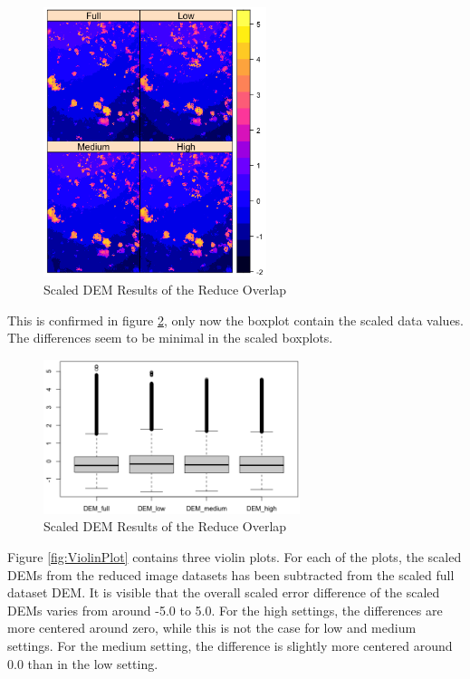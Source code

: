 \documentclass{isprs} %
\begin{document}
\begin{figure}[h]
    \centering
    \includegraphics[width=6.5cm]{DEM2x2_scaled.png}
    \caption{Scaled DEM Results of the Reduce Overlap}
    \label{fig:DemPlot_scaled}
\end{figure}

This is confirmed in figure \ref{fig:BoxPlot_scaled}, only now the boxplot contain the scaled data values.
The differences seem to be minimal in the scaled boxplots.

\begin{figure}[h!]
    \centering
    \includegraphics[width=7.5cm]{DemBoxPlot_Scaled.png}
    \caption{Scaled DEM Results of the Reduce Overlap}
    \label{fig:BoxPlot_scaled}
\end{figure}

Figure \ref{fig:ViolinPlot} contains three violin plots. 
For each of the plots, the scaled DEMs from the reduced image datasets has been subtracted from the scaled full dataset DEM.
It is visible that the overall scaled error difference of the scaled DEMs varies from around -5.0 to 5.0.
For the high settings, the differences are more centered around zero, while this is not the case for low and medium settings.
For the medium setting, the difference is slightly more centered around 0.0 than in the low setting.
\end{document}
